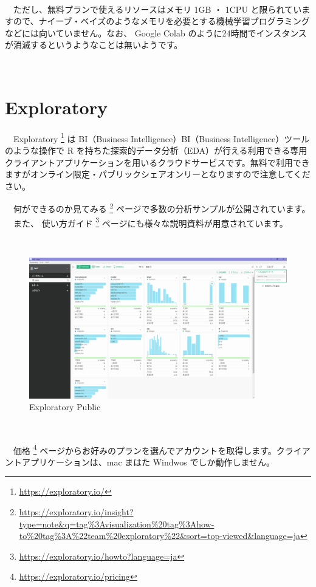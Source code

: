 \documentclass[
  12pt,
]{book}
\DeclareRobustCommand{\href}[2]{#2\footnote{\url{#1}}}
\begin{document}
　

　ただし、無料プランで使えるリソースはメモリ 1GB ・ 1CPU と限られていますので、ナイーブ・ベイズのようなメモリを必要とする機械学習プログラミングなどには向いていません。なお、 Google Colab のように24時間でインスタンスが消滅するというようなことは無いようです。

　

\hypertarget{exploratory}{%
\section{Exploratory}\label{exploratory}}

　\href{https://exploratory.io/}{Exploratory } は BI（Business Intelligence）BI（Business Intelligence）ツールのような操作で R を持ちた探索的データ分析（EDA）が行える利用できる専用クライアントアプリケーションを用いるクラウドサービスです。無料で利用できますがオンライン限定・パブリックシェアオンリーとなりますので注意してください。

　\href{https://exploratory.io/insight?type=note\&q=tag\%3Avisualization\%20tag\%3Ahow-to\%20tag\%3A\%22team\%20exploratory\%22\&sort=top-viewed\&language=ja}{何ができるのか見てみる } ページで多数の分析サンプルが公開されています。\\
　また、 \href{https://exploratory.io/howto?language=ja}{使い方ガイド } ページにも様々な説明資料が用意されています。

　\\

\begin{figure}[H]

{\centering \includegraphics[width=0.8\linewidth,]{fig/Exploratory} 

}

\caption{Exploratory Public}\label{fig:unnamed-chunk-101}
\end{figure}

　

　\href{https://exploratory.io/pricing}{価格 } ページからお好みのプランを選んでアカウントを取得します。クライアントアプリケーションは、mac まはた Windwos でしか動作しません。
\end{document}
